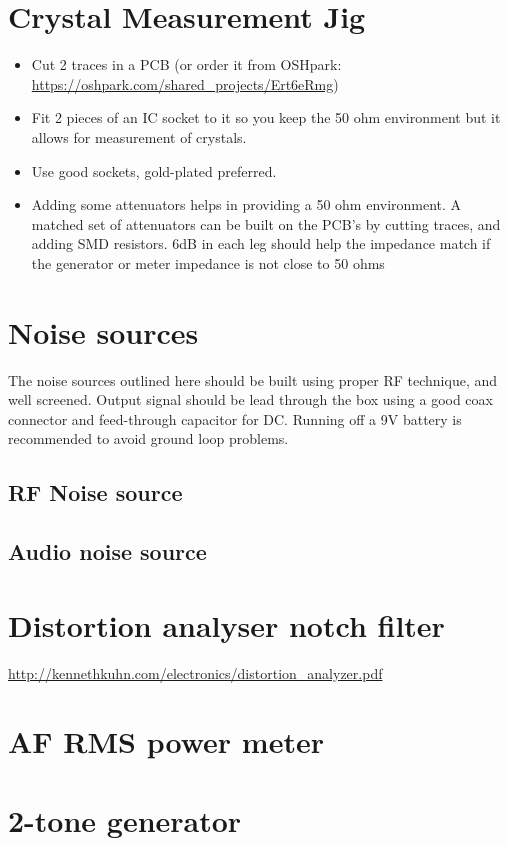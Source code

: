 \documentclass[10pt,letterpaper]{book}
\begin{document}
\section{Crystal Measurement Jig}
\begin{itemize}
	\item Cut 2 traces in a PCB (or order it from OSHpark: \url{https://oshpark.com/shared_projects/Ert6eRmg})
	\item  Fit 2 pieces of an IC socket to it so you keep the 50 ohm environment but it allows for measurement of crystals.
	\item Use good sockets, gold-plated preferred.  
	\item Adding some attenuators helps in providing a 50 ohm environment. A matched set of attenuators can be built on the PCB's by cutting traces, and adding SMD resistors. 6dB in each leg should help the impedance match if the generator or meter impedance is not close to 50 ohms
\end{itemize}

\section{Noise sources}
The noise sources outlined here should be built using proper RF technique, and well screened. Output signal should be lead through the box using a good coax connector and feed-through capacitor for DC. Running off a 9V battery is recommended to avoid ground loop problems. 
\subsection*{RF Noise source}
\subsection*{Audio noise source}
\section{Distortion analyser notch filter}
\url{http://kennethkuhn.com/electronics/distortion_analyzer.pdf}

\section{AF RMS power meter}
\section{2-tone generator}
\end{document}
